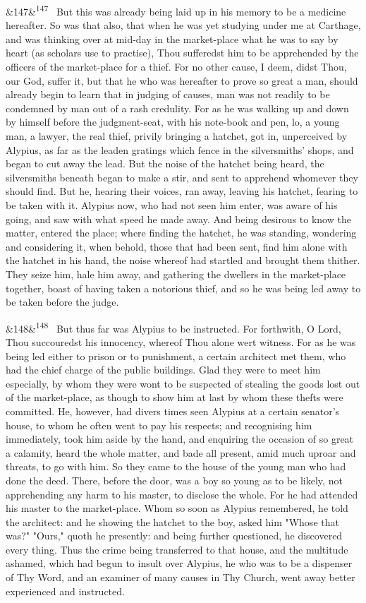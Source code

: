 \documentclass[12pt]{article}
\newcommand{\para}[1][]{\par\noindent\ifx&#1&\else\textsuperscript{\footnotesize #1}~\fi}
\begin{document}
\para[147] But this was already being laid up in his memory to be a medicine hereafter. So was that also, that when he was yet studying under me at Carthage, and was thinking over at mid-day in the market-place what he was to say by heart (as scholars use to practise), Thou sufferedst him to be apprehended by the officers of the market-place for a thief. For no other cause, I deem, didst Thou, our God, suffer it, but that he who was hereafter to prove so great a man, should already begin to learn that in judging of causes, man was not readily to be condemned by man out of a rash credulity. For as he was walking up and down by himself before the judgment-seat, with his note-book and pen, lo, a young man, a lawyer, the real thief, privily bringing a hatchet, got in, unperceived by Alypius, as far as the leaden gratings which fence in the silversmiths' shops, and began to cut away the lead. But the noise of the hatchet being heard, the silversmiths beneath began to make a stir, and sent to apprehend whomever they should find. But he, hearing their voices, ran away, leaving his hatchet, fearing to be taken with it. Alypius now, who had not seen him enter, was aware of his going, and saw with what speed he made away. And being desirous to know the matter, entered the place; where finding the hatchet, he was standing, wondering and considering it, when behold, those that had been sent, find him alone with the hatchet in his hand, the noise whereof had startled and brought them thither. They seize him, hale him away, and gathering the dwellers in the market-place together, boast of having taken a notorious thief, and so he was being led away to be taken before the judge.

\para[148] But thus far was Alypius to be instructed. For forthwith, O Lord, Thou succouredst his innocency, whereof Thou alone wert witness. For as he was being led either to prison or to punishment, a certain architect met them, who had the chief charge of the public buildings. Glad they were to meet him especially, by whom they were wont to be suspected of stealing the goods lost out of the market-place, as though to show him at last by whom these thefts were committed. He, however, had divers times seen Alypius at a certain senator's house, to whom he often went to pay his respects; and recognising him immediately, took him aside by the hand, and enquiring the occasion of so great a calamity, heard the whole matter, and bade all present, amid much uproar and threats, to go with him. So they came to the house of the young man who had done the deed. There, before the door, was a boy so young as to be likely, not apprehending any harm to his master, to disclose the whole. For he had attended his master to the market-place. Whom so soon as Alypius remembered, he told the architect: and he showing the hatchet to the boy, asked him "Whose that was?" "Ours," quoth he presently: and being further questioned, he discovered every thing. Thus the crime being transferred to that house, and the multitude ashamed, which had begun to insult over Alypius, he who was to be a dispenser of Thy Word, and an examiner of many causes in Thy Church, went away better experienced and instructed.
\end{document}

